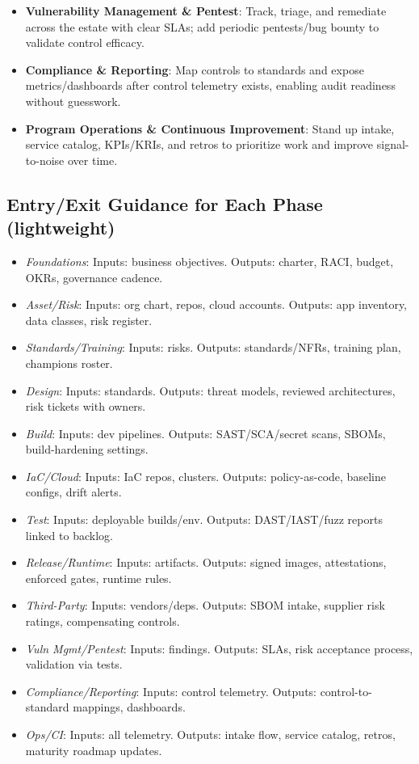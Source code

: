 \documentclass[11pt,a4paper]{article}
\begin{document}
\begin{itemize}
  \item \textbf{Vulnerability Management \& Pentest}: Track, triage, and remediate across the estate with clear SLAs; add periodic pentests/bug bounty to validate control efficacy.
  \item \textbf{Compliance \& Reporting}: Map controls to standards and expose metrics/dashboards after control telemetry exists, enabling audit readiness without guesswork.
  \item \textbf{Program Operations \& Continuous Improvement}: Stand up intake, service catalog, KPIs/KRIs, and retros to prioritize work and improve signal-to-noise over time.
\end{itemize}

\subsection*{Entry/Exit Guidance for Each Phase (lightweight)}
\begin{itemize}
  \item \textit{Foundations}: Inputs: business objectives. Outputs: charter, RACI, budget, OKRs, governance cadence.
  \item \textit{Asset/Risk}: Inputs: org chart, repos, cloud accounts. Outputs: app inventory, data classes, risk register.
  \item \textit{Standards/Training}: Inputs: risks. Outputs: standards/NFRs, training plan, champions roster.
  \item \textit{Design}: Inputs: standards. Outputs: threat models, reviewed architectures, risk tickets with owners.
  \item \textit{Build}: Inputs: dev pipelines. Outputs: SAST/SCA/secret scans, SBOMs, build-hardening settings.
  \item \textit{IaC/Cloud}: Inputs: IaC repos, clusters. Outputs: policy-as-code, baseline configs, drift alerts.
  \item \textit{Test}: Inputs: deployable builds/env. Outputs: DAST/IAST/fuzz reports linked to backlog.
  \item \textit{Release/Runtime}: Inputs: artifacts. Outputs: signed images, attestations, enforced gates, runtime rules.
  \item \textit{Third-Party}: Inputs: vendors/deps. Outputs: SBOM intake, supplier risk ratings, compensating controls.
  \item \textit{Vuln Mgmt/Pentest}: Inputs: findings. Outputs: SLAs, risk acceptance process, validation via tests.
  \item \textit{Compliance/Reporting}: Inputs: control telemetry. Outputs: control-to-standard mappings, dashboards.
  \item \textit{Ops/CI}: Inputs: all telemetry. Outputs: intake flow, service catalog, retros, maturity roadmap updates.
\end{itemize}
\end{document}
